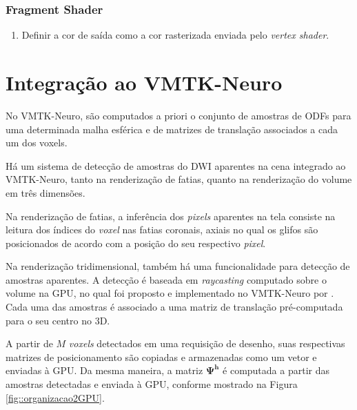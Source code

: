 \documentclass[
    12pt,                %
    oneside,            %
    a4paper,            %
    english,            %
    french,                %
    spanish,            %
    brazil                %
    ]{abntex2}
\begin{document}
\subsubsection{Fragment Shader}
\begin{enumerate}
    \item Definir a cor de saída como a cor rasterizada enviada pelo \textit{vertex shader}.
\end{enumerate}








\section{Integração ao VMTK-Neuro}

No VMTK-Neuro, são computados a priori o conjunto de amostras de ODFs para uma determinada malha esférica e de matrizes de translação associados a cada um dos voxels.

Há um sistema de detecção de amostras do DWI aparentes na cena integrado ao VMTK-Neuro, tanto na renderização de fatias, quanto na renderização do volume em três dimensões.

Na renderização de fatias, a inferência dos \textit{pixels} aparentes na tela consiste na leitura dos índices do \textit{voxel} nas fatias coronais, axiais no qual os glifos são posicionados de acordo com a posição do seu respectivo \textit{pixel}.

Na renderização tridimensional, também há uma funcionalidade para detecção de amostras aparentes. A detecção é baseada em \textit{raycasting} computado sobre o volume na GPU, no qual foi proposto e implementado no VMTK-Neuro por . Cada uma das amostras é associado a uma matriz de translação pré-computada para o seu centro no 3D.

A partir de $M$ \textit{voxels} detectados em uma requisição de desenho, suas respectivas matrizes de posicionamento são copiadas e armazenadas como um vetor e enviadas à GPU. Da mesma maneira, a matriz $\mathbf{\Psi^h}$ é computada a partir das amostras detectadas e enviada à GPU, conforme mostrado na Figura \ref{fig::organizacao2GPU}.
\end{document}
